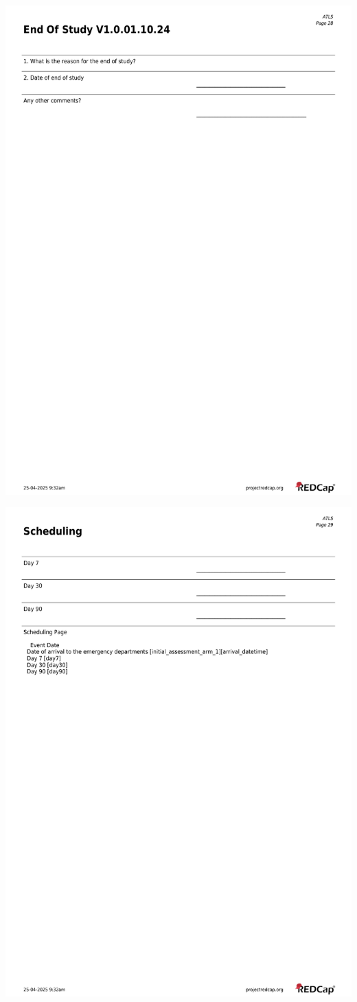 \documentclass[
]{scrartcl}
\begin{document}
\includegraphics{../case-record-form/instrument-pdfs/pages/all-instruments-28.pdf}

\includegraphics{../case-record-form/instrument-pdfs/pages/all-instruments-29.pdf}
\end{document}
